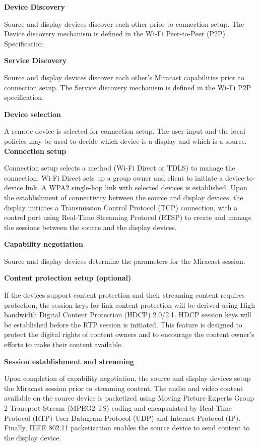 \textbf{Device Discovery}

Source and display devices discover each other prior to connection setup. The Device discovery mechanism is defined in the Wi-Fi Peer-to-Peer (P2P) Specification.

\textbf{Service Discovery}

Source and display devices discover each other's Miracast capabilities prior to connection setup. The Service discovery mechanism is defined in the Wi-Fi P2P specification.

\textbf{Device selection}

A remote device is selected for connection setup. The user input and the local policies may be used to decide which device is a display and which is a source.
\clearpage
\textbf{Connection setup}

Connection setup selects a method (Wi-Fi Direct or TDLS) to manage the connection. Wi-Fi Direct sets up a group owner and client to initiate a device-to-device link. A WPA2 single-hop link with selected devices is established. Upon the establishment of connectivity between the source and display devices, the display initiates a Transmission Control Protocol (TCP) connection, with a control port using Real-Time Streaming Protocol (RTSP) to create and manage the sessions between the source and the display devices.

\textbf{Capability negotiation} 

Source and display devices determine the parameters for the Miracast session. 

\textbf{Content protection setup (optional)}

If the devices support content protection and their streaming content requires
protection, the session keys for link content protection will be derived using High-bandwidth Digital Content Protection (HDCP) 2.0/2.1. HDCP session keys will be established before the RTP session is initiated. This feature is designed to protect the digital rights of content owners and to encourage the content owner's efforts to make their content available.

\textbf{Session establishment and streaming}

Upon completion of capability negotiation, the source and display devices setup the Miracast session prior to streaming content. The audio and video content available on the source device is packetized 
using Moving Picture Experts Group 2 Transport Stream (MPEG2-TS) coding and encapsulated by Real-Time Protocol (RTP) User Datagram Protocol (UDP) and Internet Protocol (IP). Finally, IEEE 802.11 packetization enables the source device to send content to the display device.

